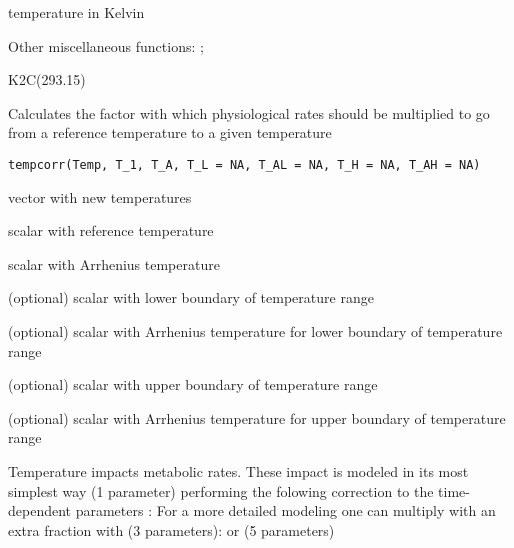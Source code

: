 \documentclass[a4paper]{book}
\begin{document}
%
\begin{Value}
temperature in Kelvin
\end{Value}
%
\begin{SeeAlso}\relax
Other miscellaneous functions: ;
\end{SeeAlso}
%
\begin{Examples}
\begin{ExampleCode}
K2C(293.15)
\end{ExampleCode}
\end{Examples}
%
\begin{Description}\relax
Calculates the factor with which physiological rates should be multiplied to go from a reference temperature to a given temperature
\end{Description}
%
\begin{Usage}
\begin{verbatim}
tempcorr(Temp, T_1, T_A, T_L = NA, T_AL = NA, T_H = NA, T_AH = NA)
\end{verbatim}
\end{Usage}
%
\begin{Arguments}
\begin{ldescription}
\item[\code{Temp}] vector with new temperatures

\item[\code{T\_1}] scalar with reference temperature

\item[\code{T\_A}] scalar with Arrhenius temperature

\item[\code{T\_L}] (optional) scalar with lower boundary of temperature range

\item[\code{T\_AL}] (optional) scalar with Arrhenius temperature for lower boundary of temperature range

\item[\code{T\_H}] (optional) scalar with upper boundary of temperature range

\item[\code{T\_AH}] (optional) scalar with Arrhenius temperature for upper boundary of temperature range
\end{ldescription}
\end{Arguments}
%
\begin{Details}\relax
Temperature impacts metabolic rates. These impact is modeled in its most simplest way (1 parameter) performing the folowing correction to the time-dependent parameters \eqn{\dot{\theta}}{}:
For a more detailed modeling one can multiply with an extra fraction  with (3 parameters):
or (5 parameters)
\end{Details}
\end{document}
